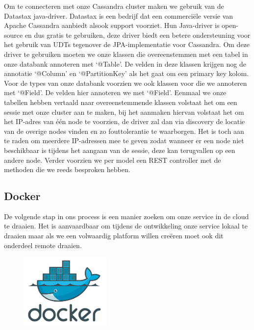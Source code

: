 \documentclass{article}
\begin{document}
\par
Om te connecteren met onze Cassandra cluster maken we gebruik van de Datastax java-driver. Datastax is een bedrijf dat een commerciële versie van Apache Cassandra aanbiedt alsook support voorziet. Hun Java-driver is open-source en dus gratis te gebruiken, deze driver biedt een betere ondersteuning voor het gebruik van UDTs tegenover de JPA-implementatie voor Cassandra. Om deze driver te gebruiken moeten we onze klassen die overeenstemmen met een tabel in onze databank annoteren met ‘@Table’. De velden in deze klassen krijgen nog de annotatie ‘@Column’ en ‘@PartitionKey’ als het gaat om een primary key kolom. Voor de types van onze databank voorzien we ook klassen voor die we annoteren met ‘@Field’. De velden hier annoteren we met ‘@Field’. Eenmaal we onze tabellen hebben vertaald naar overeenstemmende klassen volstaat het om een sessie met onze cluster aan te maken, bij het aanmaken hiervan volstaat het om het IP-adres van \'e\'en node te voorzien, de driver zal dan via discovery de locatie van de overige nodes vinden en zo fouttolerantie te waarborgen. Het is toch aan te raden om meerdere IP-adressen mee te geven zodat wanneer er een node niet beschikbaar is tijdens het aangaan van de sessie, deze kan terugvallen op een andere node. Verder voorzien we per model een REST controller met de methoden die we reeds besproken hebben.
\par
	\subsection{Docker}
	De volgende stap in ons process is een manier zoeken om onze service in de cloud te draaien. Het is aanvaardbaar om tijdens de ontwikkeling onze service lokaal te draaien maar als we een volwaardig platform willen cre\"eren moet ook dit onderdeel remote draaien.
	\par
	\begin{figure}
  	\includegraphics[width=0.4\textwidth]{images/docker-logo.PNG}
	\end{figure}
	
\end{document}
